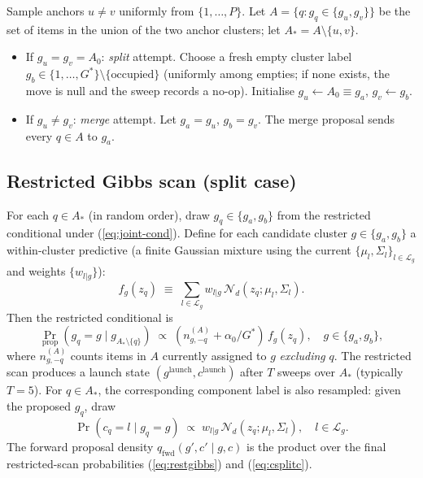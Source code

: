 \documentclass[11pt]{article}
\begin{document}
Sample anchors $u\ne v$ uniformly from $\{1,\ldots,P\}$.
Let $A=\{q:g_q\in\{g_u,g_v\}\}$ be the set of items in the union of the
two anchor clusters; let $A_*=A\setminus\{u,v\}$.
\begin{itemize}
\item If $g_u=g_v=A_0$: \emph{split} attempt. Choose a fresh empty
   cluster label $g_b\in\{1,\ldots,G^*\}\setminus\{\text{occupied}\}$
   (uniformly among empties; if none exists, the move is null and the
   sweep records a no-op). Initialise $g_u\leftarrow A_0\equiv g_a$,
   $g_v\leftarrow g_b$.
\item If $g_u\ne g_v$: \emph{merge} attempt. Let
   $g_a=g_u$, $g_b=g_v$. The merge proposal sends every $q\in A$ to
   $g_a$.
\end{itemize}

\subsection{Restricted Gibbs scan (split case)}

For each $q\in A_*$ (in random order), draw $g_q\in\{g_a,g_b\}$ from the
restricted conditional under (\ref{eq:joint-cond}). Define for each
candidate cluster $g\in\{g_a,g_b\}$ a within-cluster predictive (a finite
Gaussian mixture using the current $\{\mu_l,\Sigma_l\}_{l\in\mathcal{L}_g}$
and weights $\{w_{l|g}\}$):
\begin{equation}
f_g(z_q) \;\equiv\; \sum_{l\in\mathcal{L}_g} w_{l|g}\,
   \mathcal{N}_d(z_q;\mu_l,\Sigma_l).
\label{eq:fg}
\end{equation}
Then the restricted conditional is
\begin{equation}
\Pr_{\mathrm{prop}}(g_q=g\mid g_{A_*\setminus\{q\}})
 \;\propto\;
 (n_{g,-q}^{(A)} + \alpha_0/G^*)\,f_g(z_q),
 \quad g\in\{g_a,g_b\},
\label{eq:restgibbs}
\end{equation}
where $n_{g,-q}^{(A)}$ counts items in $A$ currently assigned to $g$
\emph{excluding} $q$. The restricted scan produces a launch state
$(g^{\mathrm{launch}},c^{\mathrm{launch}})$ after $T$ sweeps over $A_*$
(typically $T=5$). For $q\in A_*$, the corresponding component label is
also resampled: given the proposed $g_q$, draw
\begin{equation}
\Pr(c_q=l\mid g_q=g)\;\propto\;w_{l|g}\,\mathcal{N}_d(z_q;\mu_l,\Sigma_l),
\quad l\in\mathcal{L}_g.
\label{eq:csplitc}
\end{equation}
The forward proposal density $q_{\mathrm{fwd}}(g',c'\mid g,c)$ is the
product over the final restricted-scan probabilities (\ref{eq:restgibbs})
and (\ref{eq:csplitc}).
\end{document}
